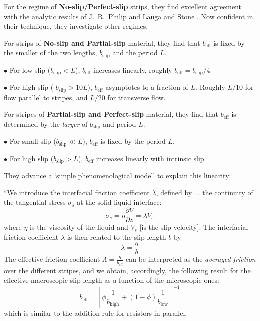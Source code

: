 \documentclass[a4paper]{report}
\newcommand{\beff}{\ensuremath{b_{\mathrm{eff}}}}
\begin{document}
For the regime of \textbf{No-slip/Perfect-slip} strips, they find excellent agreement with the analytic results of J.\ R.\ Philip \cite{Philip1972} and Lauga and Stone \cite{LaugaStone2003}.  Now confident in their technique, they investigate other regimes.

For strips of \textbf{No-slip and Partial-slip} material, they find that $\beff$ is fixed by the smaller of the two lengths, $b_{\mathrm{slip}}$ and the period $L$.

$\bullet$ For low slip ($b_{\mathrm{slip}} < L$), $\beff$ increases linearly, roughly $\beff = b_{\mathrm{slip}} / 4$

$\bullet$ For high slip ( $b_{\mathrm{slip}} > 10L$), $\beff$ asymptotes to a fraction of $L$. Roughly $L/10$ for flow parallel to stripes, and $L/20$ for transverse flow.

\vspace{1em}

For stripes of \textbf{Partial-slip and Perfect-slip} material, they find that $\beff$ is determined by the \emph{larger} of $b_{\mathrm{slip}}$ and period $L$.

$\bullet$ For small slip ($b_{\mathrm{slip}} \ll L$), $\beff$ is fixed by the period $L$.

$\bullet$ For high slip ($b_{\mathrm{slip}} > L$), $\beff$ increases linearly with intrinsic slip.

They advance a `simple phenomenological model' to explain this linearity:

``We introduce the interfacial friction coefficient $\lambda$, defined by ... the continuity of the tangential stress $\sigma_s$ at the solid-liquid interface:
\begin{equation*}
\sigma_s = \eta \frac{\partial V}{\partial z} = \lambda V_s
\end{equation*}
where $\eta$ is the viscosity of the liquid and $V_s$ [is the slip velocity]. The interfacial friction coefficient $\lambda$ is then related to the slip length $b$ by
\begin{equation*}
\lambda = \frac{\eta}{b}
\end{equation*}
The effective friction coefficient $\Lambda = \frac{\eta}{\beff}$ can be interpreted as the \emph{averaged friction} over the different stripes, and we obtain, accordingly, the following result for the effective macroscopic slip length as a function of the microscopic ones:
\begin{equation*}
\beff = \left[ \phi \frac{1}{ b_{\mathrm{high}} }  + (1 -\phi) \frac{1}{ b_{\mathrm{low}}} \right]^{-1}
\end{equation*}
which is similar to the addition rule for resistors in parallel.
\end{document}
